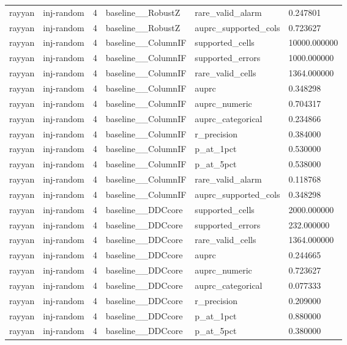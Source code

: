 \begin{tabular}{llllll}
rayyan & inj-random & 4 & baseline\_\_RobustZ & rare\_valid\_alarm & 0.247801 \\
rayyan & inj-random & 4 & baseline\_\_RobustZ & auprc\_supported\_cols & 0.723627 \\
rayyan & inj-random & 4 & baseline\_\_ColumnIF & supported\_cells & 10000.000000 \\
rayyan & inj-random & 4 & baseline\_\_ColumnIF & supported\_errors & 1000.000000 \\
rayyan & inj-random & 4 & baseline\_\_ColumnIF & rare\_valid\_cells & 1364.000000 \\
rayyan & inj-random & 4 & baseline\_\_ColumnIF & auprc & 0.348298 \\
rayyan & inj-random & 4 & baseline\_\_ColumnIF & auprc\_numeric & 0.704317 \\
rayyan & inj-random & 4 & baseline\_\_ColumnIF & auprc\_categorical & 0.234866 \\
rayyan & inj-random & 4 & baseline\_\_ColumnIF & r\_precision & 0.384000 \\
rayyan & inj-random & 4 & baseline\_\_ColumnIF & p\_at\_1pct & 0.530000 \\
rayyan & inj-random & 4 & baseline\_\_ColumnIF & p\_at\_5pct & 0.538000 \\
rayyan & inj-random & 4 & baseline\_\_ColumnIF & rare\_valid\_alarm & 0.118768 \\
rayyan & inj-random & 4 & baseline\_\_ColumnIF & auprc\_supported\_cols & 0.348298 \\
rayyan & inj-random & 4 & baseline\_\_DDCcore & supported\_cells & 2000.000000 \\
rayyan & inj-random & 4 & baseline\_\_DDCcore & supported\_errors & 232.000000 \\
rayyan & inj-random & 4 & baseline\_\_DDCcore & rare\_valid\_cells & 1364.000000 \\
rayyan & inj-random & 4 & baseline\_\_DDCcore & auprc & 0.244665 \\
rayyan & inj-random & 4 & baseline\_\_DDCcore & auprc\_numeric & 0.723627 \\
rayyan & inj-random & 4 & baseline\_\_DDCcore & auprc\_categorical & 0.077333 \\
rayyan & inj-random & 4 & baseline\_\_DDCcore & r\_precision & 0.209000 \\
rayyan & inj-random & 4 & baseline\_\_DDCcore & p\_at\_1pct & 0.880000 \\
rayyan & inj-random & 4 & baseline\_\_DDCcore & p\_at\_5pct & 0.380000 \\

\end{tabular}
